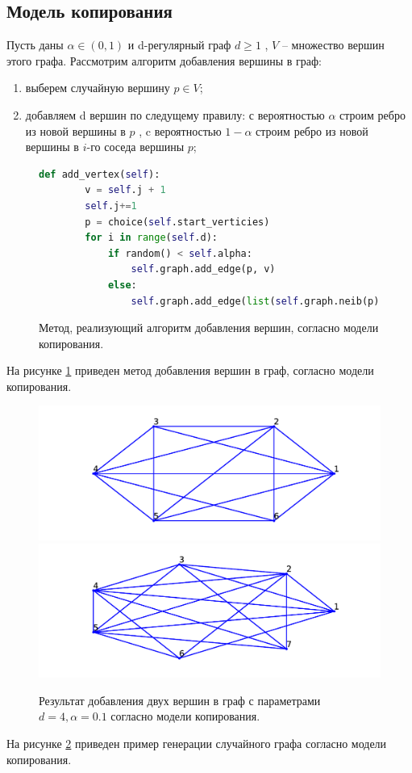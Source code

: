 \subsection{Модель копирования}
Пусть даны $\alpha \in (0,1)$ и 
 d-регулярный граф $d \ge  1$ , $V$ -- множество вершин этого графа. Рассмотрим алгоритм добавления вершины в граф:
 \begin{enumerate}
     \item выберем случайную вершину $p \in V$;
     \item добавляем d вершин по следущему правилу:
         с вероятностью $\alpha$ строим ребро из новой вершины 
         в  $p$ , c вероятностью $1 - \alpha$ строим
         ребро из новой вершины в  $i$-го соседа вершины  $p$;
 \end{enumerate}
 \begin{figure}[H] 
 \begin{lstlisting}[language=Python] 
    def add_vertex(self):
        v = self.j + 1
        self.j+=1
        p = choice(self.start_verticies)
        for i in range(self.d):
            if random() < self.alpha:
                self.graph.add_edge(p, v)
            else:
                self.graph.add_edge(list(self.graph.neib(p))[i], v)
 \end{lstlisting}  
     \caption{Метод, реализующий алгоритм добавления вершин,
     согласно модели копирования.}
     \label{cop1}
 \end{figure} 
 На рисунке \ref{cop1} приведен метод 
добавления вершин в граф, согласно модели копирования.
\begin{figure}[H] 
    \includegraphics{cop1.pdf} 
    \includegraphics{cop2.pdf} 
    \caption{Результат добавления двух вершин в граф 
    с параметрами $d = 4,\alpha = 0.1$ согласно модели копирования.}
    \label{cop2}
\end{figure} 
На рисунке \ref{cop2} приведен пример генерации случайного графа согласно модели копирования.
